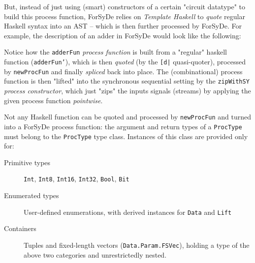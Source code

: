             But, instead of just using (smart) constructors of a certain "circuit datatype" to build
            this process function, ForSyDe relies on \emph{Template Haskell} to
            \emph{quote} regular Haskell syntax into an \ac{AST} -- which is then further processed by ForSyDe.
            For example, the description of an adder in ForSyDe would look like the following:


            Notice how the \texttt{adderFun} \emph{process function} is built from a "regular" haskell function
            (\texttt{adderFun'}), which is then \emph{quoted} (by the \texttt{[d|} quasi-quoter), processed by
            \texttt{newProcFun} and finally \emph{spliced} back into place.
            The (combinational) process function is then "lifted" into the synchronous sequential setting
            by the \texttt{zipWithSY} \emph{process constructor}, which just "zips" the inputs signals (streams)
            by applying the given process function \emph{pointwise}.

            Not any Haskell function can be quoted and processed by \texttt{newProcFun}
            and turned into a ForSyDe process function: the argument and return types of a \texttt{ProcType}
            must belong to the \texttt{ProcType} type class. Instances of this class are provided only for:

            \begin{description}
                \item[Primitive types] \texttt{Int}, \texttt{Int8}, \texttt{Int16}, \texttt{Int32}, \texttt{Bool}, \texttt{Bit}
                \item[Enumerated types] User-defined enumerations, with derived instances for \texttt{Data} and \texttt{Lift}
                \item[Containers] Tuples and fixed-length vectors (\texttt{Data.Param.FSVec}),
                    holding a type of the above two categories and unrestrictedly nested.
            \end{description}

